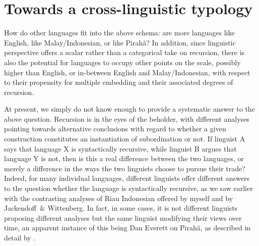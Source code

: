 \documentclass[output=paper,colorlinks,citecolor=brown
]{langscibook}
\begin{document}
\section{Towards a cross-linguistic typology}\largerpage

How do other languages fit into the above schema: are more languages like English, like Malay\slash Indonesian, or like Pirahã?  In addition, since linguistic perspective offers a scalar rather than a categorical take on recursion, there is also the potential for languages to occupy other points on the scale, possibly higher than English, or in-between English and Malay\slash Indonesian, with respect to their propensity for multiple embedding and their associated degrees of recursion.

At present, we simply do not know enough to provide a systematic answer to the above question.  Recursion is in the eyes of the beholder, with different analyses pointing towards alternative conclusions with regard to whether a given construction constitutes an instantiation of subordination or not.  If linguist A says that language X is syntactically recursive, while linguist B argues that language Y is not, then is this a real difference between the two languages, or merely a difference in the ways the two linguists choose to pursue their trade?  Indeed, for many individual languages, different linguists offer different answers to the question whether the language is syntactically recursive, as we saw earlier with the contrasting analyses of Riau Indonesian offered by myself and by Jackendoff~\& Wittenberg. In fact, in some cases, it is not different linguists proposing different analyses but the same linguist modifying their views over time, an apparent instance of this being Dan Everett on Pirahã, as described in detail by .
\end{document}
